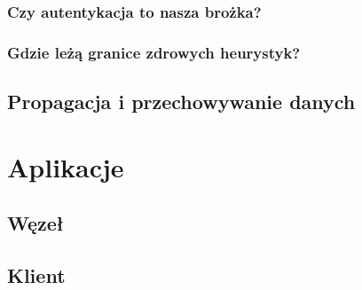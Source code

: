 \subsubsection{Czy autentykacja to nasza brożka?}
\subsubsection{Gdzie leżą granice zdrowych heurystyk?}

\subsection{Propagacja i przechowywanie danych}
\label{sec:dataPropagation}


\section{Aplikacje}

\subsection{Węzeł}
\subsection{Klient}

